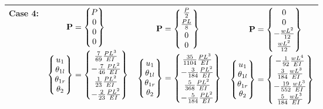 \begin{example}
{\begin{longtable}{|c|c|c|c|}
  \shortstack{Case 4:\\[2pt] } &
  $\begin{aligned}\mathbf{P} &= \begin{Bmatrix}P\\ 0\\ 0\\ 0\end{Bmatrix}\\ \begin{Bmatrix}u_1\\ \theta_{1l}\\ \theta_{1r}\\ \theta_2\end{Bmatrix} &= \begin{Bmatrix}\frac{7}{69}\frac{PL^3}{EI}\\[2pt] -\frac{7}{46}\frac{PL^2}{EI}\\[2pt] \frac{1}{23}\frac{PL^2}{EI}\\[2pt] -\frac{2}{23}\frac{PL^2}{EI}\end{Bmatrix}\end{aligned}$ &
  $\begin{aligned}\mathbf{P} &= \begin{Bmatrix}\frac P2\\[2pt] \frac{PL}{8}\\[2pt] 0\\ 0\end{Bmatrix}\\ \begin{Bmatrix}u_1\\ \theta_{1l}\\ \theta_{1r}\\ \theta_2\end{Bmatrix} &= \begin{Bmatrix}\frac{35}{1104}\frac{PL^3}{EI}\\[2pt] -\frac{3}{184}\frac{PL^2}{EI}\\[2pt] \frac{5}{368}\frac{PL^2}{EI}\\[2pt] -\frac{5}{184}\frac{PL^2}{EI}\end{Bmatrix}\end{aligned}$ &
  $\begin{aligned}\mathbf{P} &= \begin{Bmatrix}0\\ 0\\ -\frac{wL^2}{12}\\[2pt] \frac{wL^2}{12}\end{Bmatrix}\\ \begin{Bmatrix}u_1\\ \theta_{1l}\\ \theta_{1r}\\ \theta_2\end{Bmatrix} &= \begin{Bmatrix}-\frac{1}{92}\frac{wL^4}{EI}\\[2pt] \frac{3}{184}\frac{wL^3}{EI}\\[2pt] -\frac{19}{552}\frac{wL^3}{EI}\\[2pt] \frac{5}{184}\frac{wL^3}{EI}\end{Bmatrix}\end{aligned}$\\\hline
\end{longtable}}
\end{example}
